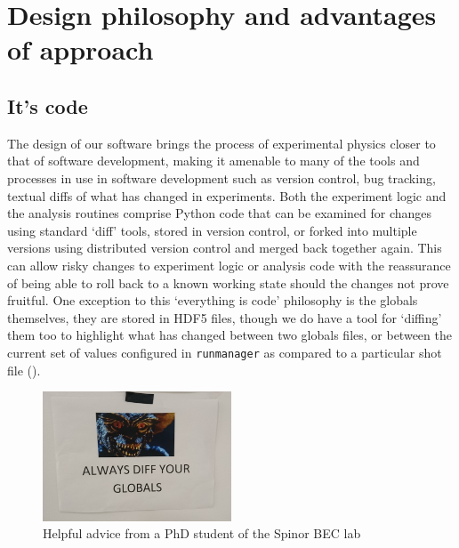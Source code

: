 \section{Design philosophy and advantages of approach}

\subsection{It's code}
The design of our software brings the process of experimental physics closer to that of software development, making it amenable to many of the tools and processes in use in software development such as version control, bug tracking, textual diffs of what has changed in experiments. Both the experiment logic and the analysis routines comprise Python code that can be examined for changes using standard `diff' tools, stored in version control, or forked into multiple versions using distributed version control and merged back together again. This can allow risky changes to experiment logic or analysis code with the reassurance of being able to roll back to a known working state should the changes not prove fruitful. One exception to this `everything is code' philosophy is the globals themselves, they are stored in HDF5 files, though we do have a tool for `diffing' them too to highlight what has changed between two globals files, or between the current set of values configured in \texttt{runmanager} as compared to a particular shot file ().

\begin{figure}
\begin{center}
\includegraphics[width=0.5\textwidth]{figures/software/globals_diff.png}
\caption{Helpful advice from a PhD student of the Spinor BEC lab}\label{fig:globals_diff}
\end{center}
\end{figure}

